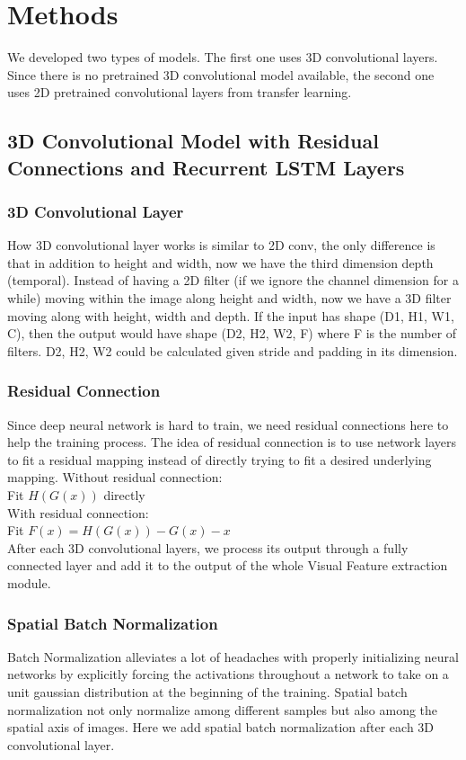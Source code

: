 \documentclass[10pt,twocolumn,letterpaper]{article}
\begin{document}
\section{Methods}

We developed two types of models. The first one uses 3D convolutional layers. Since there is no pretrained 3D convolutional model available, the second one uses 2D pretrained convolutional layers from transfer learning.




\subsection{3D Convolutional Model with Residual Connections and Recurrent LSTM Layers}

\subsubsection{3D Convolutional Layer}
How 3D convolutional layer works is similar to 2D conv, the only difference is that in addition to height and width, now we have the third dimension depth (temporal). Instead of having a 2D filter (if we ignore the channel dimension for a while) moving within the image along height and width, now we have a 3D filter moving along with height, width and depth. If the input has shape (D1, H1,  W1, C), then the output would have shape (D2, H2, W2, F) where F is the number of filters. D2, H2, W2 could be calculated given stride and padding in its dimension.

\subsubsection{Residual Connection}
Since deep neural network is hard to train, we need residual connections here to help the training process. The idea of residual connection is to use network layers to fit a residual mapping instead of directly trying to fit a desired underlying mapping. 
Without residual connection:\\
Fit $H(G(x))$ directly\\
With residual connection:\\
Fit $F(x)=H(G(x))-G(x)-x$\\
After each 3D convolutional layers, we process its output through a fully connected layer and add it to the output of the whole Visual Feature extraction module.

\subsubsection{Spatial Batch Normalization}
Batch Normalization alleviates a lot of headaches with properly initializing neural networks by explicitly forcing the activations throughout a network to take on a unit gaussian distribution at the beginning of the training. Spatial batch normalization not only normalize among different samples but also among the spatial axis of images. Here we add spatial batch normalization after each 3D convolutional layer.
\end{document}
